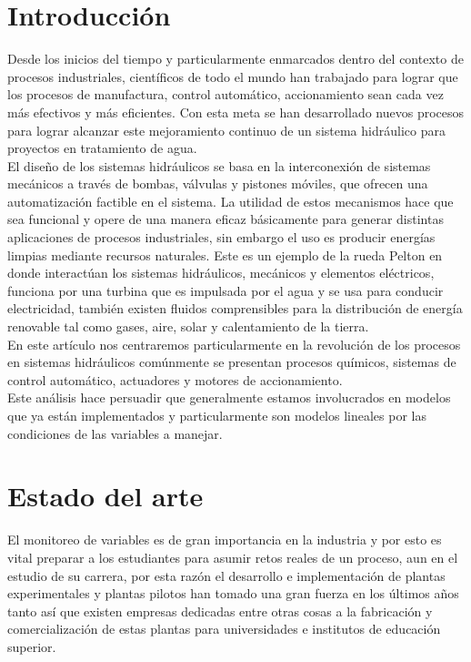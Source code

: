 \documentclass[a4paper,12pt,twoside]{proyectotanquesecci}
\begin{document}
\newpage

\section{Introducción}

Desde los inicios del tiempo y particularmente enmarcados dentro del contexto de procesos industriales, científicos de todo el mundo han trabajado para lograr que los procesos de manufactura, control automático, accionamiento sean cada vez más efectivos y más eficientes. Con esta meta se han desarrollado nuevos procesos para lograr alcanzar este mejoramiento continuo de un sistema hidráulico para proyectos en tratamiento de agua.\\

El diseño de los sistemas hidráulicos se basa en la interconexión de  sistemas mecánicos a través de bombas, válvulas y pistones móviles, que ofrecen una automatización factible  en el sistema. La utilidad de estos mecanismos hace que sea  funcional y  opere de una manera  eficaz básicamente para generar distintas aplicaciones de procesos industriales, sin embargo el uso es producir energías limpias mediante recursos naturales. Este es un ejemplo de la rueda Pelton en donde interactúan los sistemas hidráulicos, mecánicos y elementos eléctricos, funciona por una turbina que es impulsada por el agua y se usa para conducir electricidad, también existen fluidos comprensibles para la distribución de energía renovable tal como gases, aire, solar y calentamiento de la tierra.\\

En este artículo nos centraremos particularmente en la revolución de los procesos en sistemas hidráulicos comúnmente se presentan  procesos químicos, sistemas de control automático, actuadores y motores de accionamiento.\\

Este análisis hace persuadir que generalmente estamos involucrados en modelos que ya están implementados y particularmente son modelos lineales por las condiciones de las variables a manejar.\\

\newpage

\section{Estado del arte}

El monitoreo de variables es de gran importancia en la industria y por esto es vital preparar a los estudiantes para asumir retos reales de un proceso, aun en el estudio de su carrera, por esta razón el desarrollo e implementación de plantas experimentales y plantas pilotos han tomado una gran fuerza en los últimos años tanto así que existen empresas dedicadas entre otras cosas a la fabricación y comercialización de estas plantas para universidades e institutos de educación superior.\\
\end{document}
